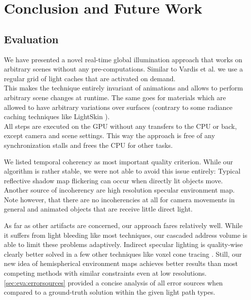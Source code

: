 \documentclass[thesis.tex]{subfiles}
\begin{document}
\chapter{Conclusion and Future Work}\label{chap:concl}


\section{Evaluation}
We have presented a novel real-time global illumination approach that works on arbitrary scenes without any pre-computations.
Similar to Vardis et al. \cite{bib:radiancecachechromaticcompression} we use a regular grid of light caches that are activated on demand.
\\
This makes the technique entirely invariant of animations and allows to perform arbitrary scene changes at runtime.
The same goes for materials which are allowed to have arbitrary variations over surfaces (contrary to some radiance caching techniques like LightSkin \cite{bib:LightskinPaper}).
\\
All steps are executed on the GPU without any transfers to the CPU or back, except camera and scene settings.
This way the approach is free of any synchronization stalls and frees the CPU for other tasks.

We listed temporal coherency as most important quality criterion.
While our algorithm is rather stable, we were not able to avoid this issue entirely:
Typical reflective shadow map flickering can occur when directly lit objects move.
Another source of incoherency are high resolution specular environment map.
Note however, that there are no incoherencies at all for camera movements in general and animated objects that are receive little direct light.

As far as other artifacts are concerned, our approach fares relatively well.
While it suffers from light bleeding like most techniques, our cascaded address volume is able to limit these problems adaptively.
Indirect specular lighting is quality-wise clearly better solved in a few other techniques like voxel cone tracing \cite{bib:voxelconetracing}.
Still, our new idea of hemispherical environment maps achieves better results than most competing methods with similar constraints even at low resolutions.
\autoref{sec:eva:errorsources} provided a concise analysis of all error sources when compared to a ground-truth solution within the given light path types.
\end{document}
